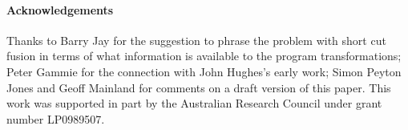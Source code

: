\documentclass[preprint]{sigplanconf}
\begin{document}
\paragraph{Acknowledgements}
Thanks to Barry Jay for the suggestion to phrase the problem with short cut fusion in terms of what information is available to the program transformations; Peter Gammie for the connection with John Hughes's early work; Simon Peyton Jones and Geoff Mainland for comments on a draft version of this paper. This work was supported in part by the Australian Research Council under grant number LP0989507. 


\vspace{-1ex}

\end{document}
